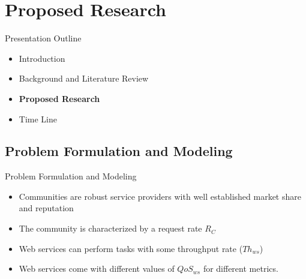 \documentclass{beamer}
\begin{document}


\section{Proposed Research}
\begin{frame}{Presentation Outline}
    \begin{itemize}
     	\itemsep=.5cm
    	\item Introduction
    	\item Background and Literature Review
    	\item {\bf Proposed Research}
    	\item Time Line
    \end{itemize}
\end{frame}

\subsection{Problem Formulation and Modeling}

\begin{frame}{Problem Formulation and Modeling}
    \begin{itemize}
        \item Communities are robust service providers with well established market share and reputation
        \item The community is characterized by a request rate $R_C$
        \item Web services can perform tasks with some throughput rate ($Th_{ws}$)
        \item Web services come with different values of $QoS_{ws}$ for different metrics.
    \end{itemize}
\end{frame}
\end{document}
